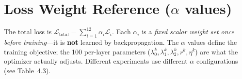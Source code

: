 \documentclass[11pt, letterpaper]{article}
\begin{document}
\newpage
\section*{Loss Weight Reference ($\alpha$ values)}

\begin{tcolorbox}[
  enhanced,
  colback=blue!3!white,
  colframe=SectionBlue,
  fonttitle=\bfseries\sffamily,
  title={Complete $\alpha$ Reference},
  coltitle=white,
  attach boxed title to top center={yshift=-2mm},
  boxed title style={colback=SectionBlue, colframe=SectionBlue, sharp corners, size=small},
  left=6pt, right=6pt, top=6pt, bottom=6pt
]
{\small The total loss is $\mathcal{L}_{\text{total}} = \sum_{i=1}^{12} \alpha_i \mathcal{L}_i$.
Each $\alpha_i$ is a \emph{fixed scalar weight set once before training}---it is
\textbf{not} learned by backpropagation.  The $\alpha$ values define the training
objective; the 100 per-layer parameters ($\lambda_0^k, \lambda_1^k, \lambda_2^k,
r^k, \eta^k$) are what the optimizer actually adjusts.  Different experiments use
different $\alpha$ configurations (see Table~4.3).}
\end{tcolorbox}

\vspace{0.8em}
\end{document}

